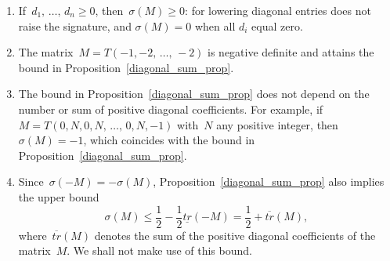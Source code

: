 \documentclass[AHL,Unicode,longabstracts,published]{cedram}
\begin{document}
\begin{rema}\label{diagonal_sum_remark}\leavevmode
\begin{enumerate}
\item\label{rema3.3.1} If~$d_1,\,\dots,\,d_n \ge 0$, then~$\sigma(M) \ge 0$: for lowering diagonal entries does not raise the signature, and $\sigma(M)=0$ when all $d_i$ equal zero.
\item\label{rema3.3.2} The matrix~$M = T(-1,-2,\,\dots,\,-2)$ is negative definite and attains the bound in Proposition~\ref{diagonal_sum_prop}.
\item\label{rema3.3.3} The bound in Proposition~\ref{diagonal_sum_prop} does not depend on the number or sum of positive diagonal coefficients. For example, if~$M = T(0,N,0,N,\,\dots,\,0,N,-1)$ with~$N$ any positive integer, then~$\sigma(M) = -1$, which coincides with the bound in Proposition~\ref{diagonal_sum_prop}.
\item\label{rema3.3.4} Since~$\sigma(-M) = - \sigma(M)$, Proposition~\ref{diagonal_sum_prop} also implies the upper bound
\[
\sigma(M) \le \frac{1}{2} - \frac{1}{2} \underline{tr}(-M)= \frac{1}{2} + \overline{tr}(M),
\]
where~$\overline{tr}(M)$ denotes the sum of the positive diagonal coefficients of the matrix~$M$. We shall not make use of this bound.
\end{enumerate}
\end{rema}
\end{document}
